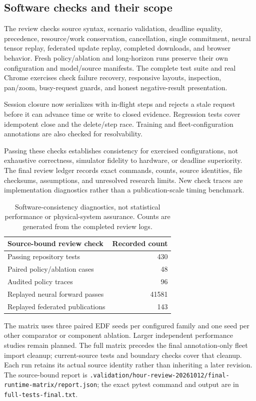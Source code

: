 \documentclass[11pt,a4paper]{article}
\newcommand{\code}[1]{\nolinkurl{#1}}
\begin{document}
\subsection{Software checks and their scope}
The review checks source syntax, scenario validation, deadline equality,
precedence, resource/work conservation, cancellation, single commitment,
neural tensor replay, federated update replay, completed downloads, and browser
behavior. Fresh policy/ablation and long-horizon runs preserve their own
configuration and model/source manifests. The complete test suite and real
Chrome exercises check failure recovery, responsive layouts, inspection,
pan/zoom, busy-request guards, and honest negative-result presentation.

Session closure now serializes with in-flight steps and rejects a stale request
before it can advance time or write to closed evidence. Regression tests cover
idempotent close and the delete/step race. Training and fleet-configuration annotations
are also checked for resolvability.

Passing these checks establishes consistency for exercised configurations,
not exhaustive correctness, simulator fidelity to hardware, or deadline superiority.
The final review ledger records exact commands, counts, source identities,
file checksums, assumptions, and unresolved research limits. New check traces
are implementation diagnostics rather than a publication-scale timing benchmark.

\begin{table}[htbp]
\centering\small
\begin{tabular}{lr}
\toprule Source-bound review check & Recorded count\\\midrule
Passing repository tests & 430 \\
Paired policy/ablation cases & 48 \\
Audited policy traces & 96 \\
Replayed neural forward passes & 41581 \\
Replayed federated publications & 143 \\
\bottomrule
\end{tabular}
\caption{Software-consistency diagnostics, not statistical performance or
physical-system assurance. Counts are generated from the completed review logs.}
\end{table}

The matrix uses three paired EDF seeds per configured family and one seed per
other comparator or component ablation. Larger independent performance studies
remain planned. The full matrix precedes the final annotation-only fleet import
cleanup; current-source tests and boundary checks cover that cleanup. Each run
retains its actual source identity rather than inheriting a later revision.
The source-bound report is
\code{.validation/hour-review-20261012/final-runtime-matrix/report.json};
the exact pytest command and output are in \code{full-tests-final.txt}.
\end{document}
